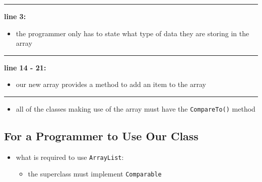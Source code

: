 \vspace{0.1cm}
\noindent
\textcolor{RedOrange}{\rule{\textwidth}{0.5pt}}
\vspace{-0.1cm}

\noindent
\begin{minipage}{0.15\textwidth}
    \textcolor{RedOrange}{\textbf{line 3:}}
\end{minipage}
\begin{minipage}{0.85\textwidth}
    \begin{itemize}
        \item[] the programmer only has to state what type of data they are storing in the array
    \end{itemize}
\end{minipage}

\vspace{0.1cm}
\noindent
\textcolor{RedOrange}{\rule{\textwidth}{0.5pt}}
\vspace{-0.1cm}

\noindent
\begin{minipage}{0.15\textwidth}
    \textcolor{RedOrange}{\textbf{line 14 - 21:}}
\end{minipage}
\begin{minipage}{0.85\textwidth}
    \begin{itemize}
        \item[] our new array provides a method to add an item to the array
    \end{itemize}
\end{minipage}

\vspace{0.1cm}
\noindent
\textcolor{RedOrange}{\rule{\textwidth}{0.5pt}}

\begin{itemize}
    \item all of the classes making use of the array must have the \texttt{CompareTo()} method
\end{itemize}

\subsection{For a Programmer to Use Our Class}

\begin{itemize}
    \item what is required to use \texttt{ArrayList}:
        \begin{itemize}
            \item[1.] the superclass must implement \texttt{Comparable}
        \end{itemize}
\end{itemize}

